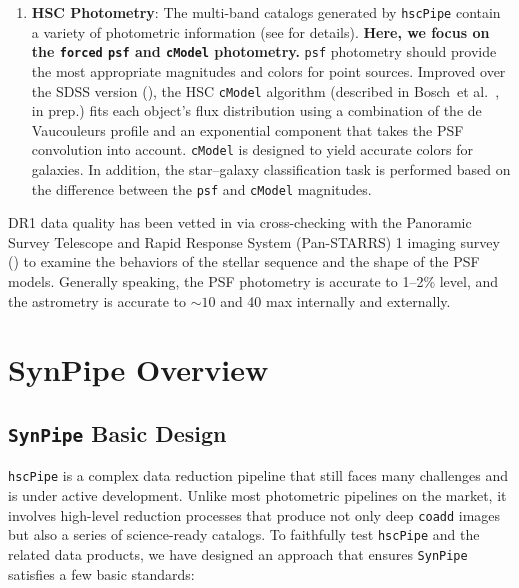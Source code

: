 \documentclass[useamsfonts]{pasj01}
\def\etal{{\ et al.~}}
\def\hscpipe{\texttt{hscPipe}}
\def\synpipe{\texttt{SynPipe}}
\def\cmodel{\texttt{cModel}}
\def\forced{\texttt{forced}}
\def\coadd{\texttt{coadd}}
\begin{document}
\begin{enumerate}
        \item \textbf{HSC Photometry}:
            The multi-band catalogs generated by \hscpipe{} contain a variety of 
            photometric information (see \citealt{HSCDR1} for details).
            \textbf{Here, we focus on the \forced{} \texttt{psf} and \cmodel{}
            photometry.}
            \texttt{psf} photometry should provide the most appropriate magnitudes and
            colors for point sources.
            Improved over the SDSS version (\citealt{Lupton2001, Abazajian2004}),
            the HSC \cmodel{} algorithm (described in Bosch\etal, in prep.) fits 
            each object's flux distribution using a combination of the de Vaucouleurs
            profile and an exponential component that takes the PSF convolution 
            into account.
            \cmodel{} is designed to yield accurate colors for galaxies.
            In addition, the star--galaxy classification task is performed based on 
            the difference between the \texttt{psf} and \cmodel{}{} magnitudes.

    \end{enumerate}

    DR1 data quality has been vetted in \citet{HSCDR1} via cross-checking
    with the Panoramic Survey Telescope and Rapid Response System (Pan-STARRS) 1
    imaging survey (\citealt{Schlafly2012, Tonry2012, Magnier2013}) to examine the
    behaviors of the stellar sequence and the shape of the PSF models.
    Generally speaking, the PSF photometry is accurate to 1--2\% level, and the
    astrometry is accurate to ${\sim}10$ and 40 max internally and externally.


\section{SynPipe Overview}
    \label{sec:synpipe}

\subsection{ \synpipe{} Basic Design}
    \label{ssec:design}

    \hscpipe{} is a complex data reduction pipeline that still faces many challenges
    and is under active development. 
    Unlike most photometric pipelines on the market, it involves high-level reduction
    processes that produce not only deep \coadd{} images but also a series of
    science-ready catalogs.
    To faithfully test \hscpipe{} and the related data products, we have designed an 
    approach that ensures \synpipe{} satisfies a few basic standards:
\end{document}

